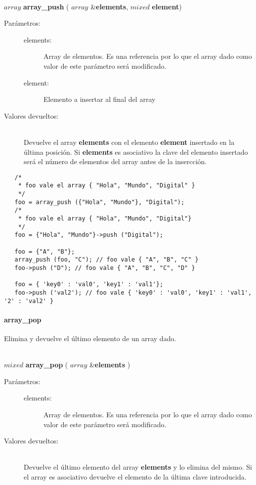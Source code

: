 \begin{framed}
\hfill \\ $array$ \textbf{array\_push} ( $array$ \&\textbf{elements}, $mixed$ \textbf{element})  
\begin{description}
\item [Parámetros:] \hfill 
   \begin{description}
   \item[elements:] Array de elementos. Es una referencia por lo que el array dado como valor de este parámetro será modificado. 
   \item[element:] Elemento a insertar al final del array
   \end{description}
\item[Valores devueltos:] \hfill \\
   Devuelve el array \textbf{elements} con el elemento \textbf{element} insertado en la última posición. Si \textbf{elements} es
   asociativo la clave del elemento insertado será el número de elementos del array antes de la insercción. 
\end{description}
\end{framed}
     
\begin{lstlisting}   
   /*
    * foo vale el array { "Hola", "Mundo", "Digital" }
    */
   foo = array_push ({"Hola", "Mundo"}, "Digital"); 
   /*
    * foo vale el array { "Hola", "Mundo", "Digital"}
    */
   foo = {"Hola", "Mundo"}->push ("Digital");
   
   foo = {"A", "B"};
   array_push (foo, "C"); // foo vale { "A", "B", "C" }
   foo->push ("D"); // foo vale { "A", "B", "C", "D" }
   
   foo = { 'key0' : 'val0', 'key1' : 'val1'};
   foo->push ('val2'); // foo vale { 'key0' : 'val0', 'key1' : 'val1', '2' : 'val2' }
\end{lstlisting}

\paragraph{array\_pop}
Elimina y devuelve el último elemento de un array dado. 

\begin{framed}
\hfill \\ $mixed$ \textbf{array\_pop} ( $array$ \&\textbf{elements} )  
\begin{description}
\item [Parámetros:] \hfill 
   \begin{description}
   \item[elements:] Array de elementos. Es una referencia por lo que el array dado como valor de este parámetro será modificado. 
   \end{description}
\item[Valores devueltos:] \hfill \\
   Devuelve el último elemento del array \textbf{elements} y lo elimina del mismo. Si el array es asociativo devuelve el
   elemento de la última clave introducida.
\end{description}
\end{framed}
     
